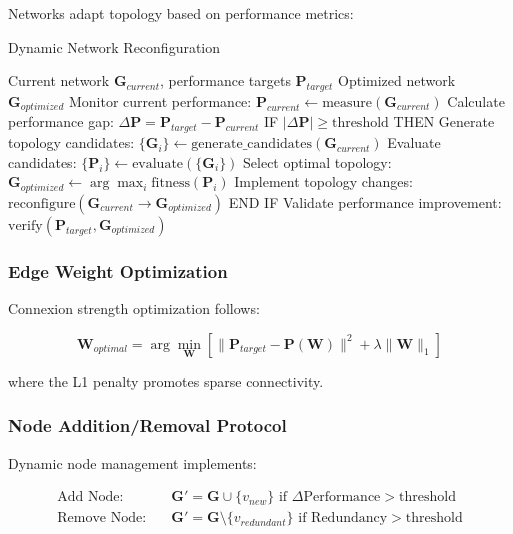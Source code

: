 \documentclass[12pt,a4paper]{article}
\begin{document}
Networks adapt topology based on performance metrics:

\begin{algorithm}[H]
\caption{Dynamic Network Reconfiguration}
\begin{algorithmic}[1]
\REQUIRE Current network $\mathbf{G}_{current}$, performance targets $\mathbf{P}_{target}$
\ENSURE Optimized network $\mathbf{G}_{optimized}$
\STATE Monitor current performance: $\mathbf{P}_{current} \leftarrow \text{measure}(\mathbf{G}_{current})$
\STATE Calculate performance gap: $\Delta \mathbf{P} = \mathbf{P}_{target} - \mathbf{P}_{current}$
\STATE IF $|\Delta \mathbf{P}| \ge \text{threshold}$ THEN
\STATE \quad Generate topology candidates: $\{\mathbf{G}_i\} \leftarrow \text{generate\_candidates}(\mathbf{G}_{current})$
\STATE \quad Evaluate candidates: $\{\mathbf{P}_i\} \leftarrow \text{evaluate}(\{\mathbf{G}_i\})$
\STATE \quad Select optimal topology: $\mathbf{G}_{optimized} \leftarrow \arg\max_i \text{fitness}(\mathbf{P}_i)$
\STATE \quad Implement topology changes: $\text{reconfigure}(\mathbf{G}_{current} \rightarrow \mathbf{G}_{optimized})$
\STATE END IF
\STATE Validate performance improvement: $\text{verify}(\mathbf{P}_{target}, \mathbf{G}_{optimized})$
\end{algorithmic}
\end{algorithm}

\subsubsection{Edge Weight Optimization}

Connexion strength optimization follows:

\begin{equation}
\mathbf{W}_{optimal} = \arg\min_{\mathbf{W}} \left[ \|\mathbf{P}_{target} - \mathbf{P}(\mathbf{W})\|^2 + \lambda \|\mathbf{W}\|_1 \right]
\end{equation}

where the L1 penalty promotes sparse connectivity.

\subsubsection{Node Addition/Removal Protocol}

Dynamic node management implements:

\begin{align}
\text{Add Node}: &\quad \mathbf{G}' = \mathbf{G} \cup \{v_{new}\} \text{ if } \Delta \text{Performance} > \text{threshold} \\
\text{Remove Node}: &\quad \mathbf{G}' = \mathbf{G} \setminus \{v_{redundant}\} \text{ if } \text{Redundancy} > \text{threshold}
\end{align}
\end{document}
